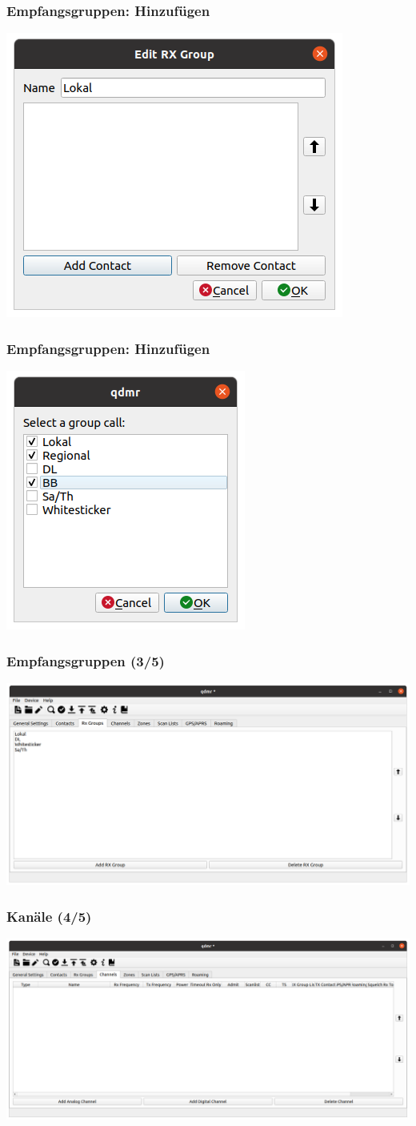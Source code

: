 \documentclass[aspectratio=169]{beamer}
\begin{document}
\begin{frame} \frametitle{Empfangsgruppen: Hinzufügen}
\begin{center}
 \includegraphics[width=0.25\linewidth]{../fig/qdmr-edit-rxgroup-empty.png}
\end{center}
\end{frame}

\begin{frame} \frametitle{Empfangsgruppen: Hinzufügen}
\begin{center}
 \includegraphics[width=0.25\linewidth]{../fig/qdmr-edit-rxgroup-select.png}
\end{center}
\end{frame}

\begin{frame} \frametitle{Empfangsgruppen (3/5)}
\begin{center}
 \includegraphics[width=0.75\linewidth]{../fig/qdmr-rxgroup-list.png}
\end{center}
\end{frame}

\begin{frame} \frametitle{Kanäle (4/5)}
\begin{center}
 \includegraphics[width=0.75\linewidth]{../fig/qdmr-channels-empty.png}
\end{center}
\end{frame}
\end{document}
